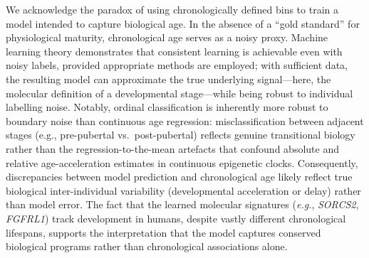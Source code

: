 \documentclass[10pt,a4paper]{article}
\begin{document}
We acknowledge the paradox of using chronologically defined bins to train a model intended to capture biological age. In the absence of a ``gold standard'' for physiological maturity, chronological age serves as a noisy proxy. Machine learning theory demonstrates that consistent learning is achievable even with noisy labels, provided appropriate methods are employed\cite{natarajan_learning_2013}; with sufficient data, the resulting model can approximate the true underlying signal---here, the molecular definition of a developmental stage---while being robust to individual labelling noise. Notably, ordinal classification is inherently more robust to boundary noise than continuous age regression: misclassification between adjacent stages (e.g., pre-pubertal vs.\ post-pubertal) reflects genuine transitional biology rather than the regression-to-the-mean artefacts that confound absolute and relative age-acceleration estimates in continuous epigenetic clocks\cite{teschendorff_epigenetic_2025}. Consequently, discrepancies between model prediction and chronological age likely reflect true biological inter-individual variability (developmental acceleration or delay) rather than model error. The fact that the learned molecular signatures (\textit{e.g.}, \textit{SORCS2}, \textit{FGFRL1}) track development in humans, despite vastly different chronological lifespans, supports the interpretation that the model captures conserved biological programs rather than chronological associations alone.
\end{document}

